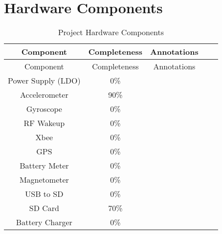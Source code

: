 \section{Hardware Components}
    \begin{center}
    \begin{longtable}{|c|c|c|c|c|}
        \caption{Project Hardware Components \label{tab:hwComp}} \\
        \hline
        \rowcolor{Gray}
        Component & Completeness & Annotations \\
        \hline \hline \endfirsthead
        \hline
        \rowcolor{Gray}
        Component & Completeness & Annotations \\
        \hline \hline \endhead
        \endfoot
        Power Supply (LDO) & 0\%   &  \\ \hline
        Accelerometer & 90\%  &  \\ \hline
        Gyroscope & 0\%   &  \\ \hline
        RF Wakeup & 0\%   &  \\ \hline
        Xbee  & 0\%   &  \\ \hline
        GPS   & 0\%   &  \\ \hline
        Battery Meter & 0\%   &  \\ \hline
        Magnetometer & 0\%   &  \\ \hline
        USB to SD & 0\%   &  \\ \hline
        SD Card & 70\%  &  \\ \hline
        Battery Charger & 0\%   &  \\ \hline
    \end{longtable}
    \end{center}

